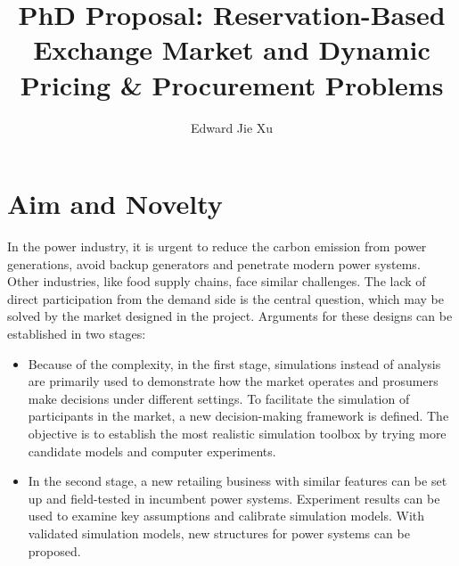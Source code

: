 \documentclass[letterpaper,8pt,twocolumn,twoside,]{pinp}
\title{PhD Proposal: Reservation-Based Exchange Market and Dynamic
Pricing \& Procurement Problems}
\author[a]{Edward Jie Xu}
\affil[a]{Department of Technology, Management and Economics,
Technical Univeristy of Denmark, Denmark}
\providecommand{\tightlist}{%
  \setlength{\itemsep}{0pt}\setlength{\parskip}{0pt}}
\begin{document}
\verticaladjustment{-2pt}

\maketitle
\thispagestyle{firststyle}



\hypertarget{aim-and-novelty}{%
\section{Aim and Novelty}\label{aim-and-novelty}}

In the power industry, it is urgent to reduce the carbon emission from
power generations, avoid backup generators and penetrate modern power
systems. Other industries, like food supply chains, face similar
challenges. The lack of direct participation from the demand side is the
central question, which may be solved by the market designed in the
project. Arguments for these designs can be established in two stages:

\begin{itemize}
\tightlist
\item
  Because of the complexity, in the first stage, simulations instead of
  analysis are primarily used to demonstrate how the market operates and
  prosumers make decisions under different settings. To facilitate the
  simulation of participants in the market, a new decision-making
  framework is defined. The objective is to establish the most realistic
  simulation toolbox by trying more candidate models and computer
  experiments.
\item
  In the second stage, a new retailing business with similar features
  can be set up and field-tested in incumbent power systems. Experiment
  results can be used to examine key assumptions and calibrate
  simulation models. With validated simulation models, new structures
  for power systems can be proposed.
\end{itemize}
\end{document}

